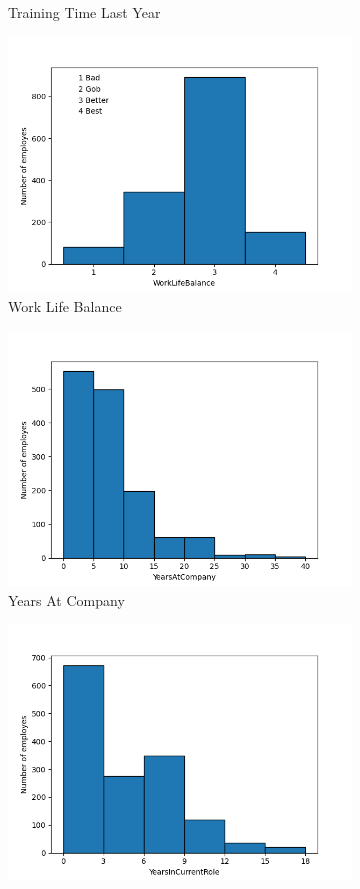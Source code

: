 \documentclass[english]{article}
\begin{document}
\begin{figure} [h]
\begin{subfigure}{.5\textwidth}
  \caption{Training Time Last Year}
  \label{fig:sfig19}
\end{subfigure}%
\begin{subfigure}{.5\textwidth}
  \centering
  \includegraphics[width=.8\linewidth]{Work Life Balance.png}
  \caption{Work Life Balance}
  \label{fig:sfig20}
\end{subfigure}
\begin{subfigure}{.5\textwidth}
  \centering
  \includegraphics[width=.8\linewidth]{YearsAtCompany.png}
  \caption{Years At Company}
  \label{fig:sfig21}
\end{subfigure}%
\begin{subfigure}{.5\textwidth}
  \centering
  \includegraphics[width=.8\linewidth]{YearsInCurrentRole.png}

\end{subfigure}
\end{figure}
\end{document}
